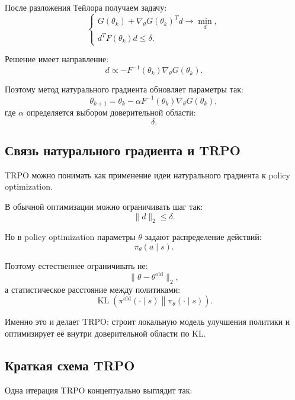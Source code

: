 \documentclass[12pt,a4paper]{article}
\begin{document}
После разложения Тейлора получаем задачу:
\[
\begin{cases}
G(\theta_k)
+
\nabla_\theta G(\theta_k)^T d
\to
\min\limits_d,
\\[0.4em]
d^T F(\theta_k)d
\le
\delta.
\end{cases}
\]

Решение имеет направление:
\[
d
\propto
-
F^{-1}(\theta_k)
\nabla_\theta G(\theta_k).
\]

Поэтому метод натурального градиента обновляет параметры так:
\[
\theta_{k+1}
=
\theta_k
-
\alpha
F^{-1}(\theta_k)
\nabla_\theta G(\theta_k),
\]
где $\alpha$ определяется выбором доверительной области:
\[
\delta.
\]

\subsection{Связь натурального градиента и TRPO}

TRPO можно понимать как применение идеи натурального градиента к policy optimization.

В обычной оптимизации можно ограничивать шаг так:
\[
\|d\|_2\le \delta.
\]

Но в policy optimization параметры $\theta$ задают распределение действий:
\[
\pi_\theta(a\mid s).
\]

Поэтому естественнее ограничивать не:
\[
\|\theta-\theta^{\mathrm{old}}\|_2,
\]
а статистическое расстояние между политиками:
\[
\operatorname{KL}
\left(
\pi^{\mathrm{old}}(\cdot\mid s)
\middle\|
\pi_\theta(\cdot\mid s)
\right).
\]

Именно это и делает TRPO: строит локальную модель улучшения политики и оптимизирует её внутри доверительной области по KL.

\subsection{Краткая схема TRPO}

Одна итерация TRPO концептуально выглядит так:
\end{document}

